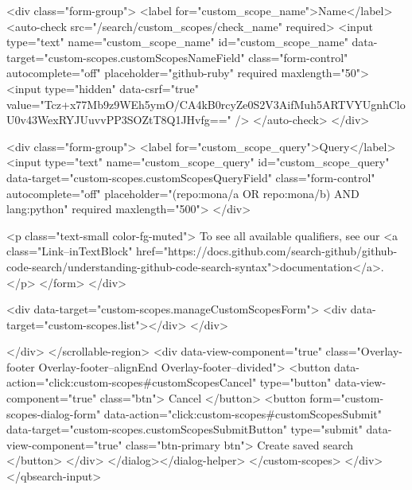           <div class="form-group">
            <label for="custom_scope_name">Name</label>
            <auto-check src="/search/custom_scopes/check_name" required>
              <input
                type="text"
                name="custom_scope_name"
                id="custom_scope_name"
                data-target="custom-scopes.customScopesNameField"
                class="form-control"
                autocomplete="off"
                placeholder="github-ruby"
                required
                maxlength="50">
              <input type="hidden" data-csrf="true" value="Tcz+x77Mb9z9WEh5ymO/CA4kB0rcyZe0S2V3AifMuh5ARTVYUgnhCloU0v43WexRYJUuvvPP3SOZtT8Q1JHvfg==" />
            </auto-check>
          </div>

          <div class="form-group">
            <label for="custom_scope_query">Query</label>
            <input
              type="text"
              name="custom_scope_query"
              id="custom_scope_query"
              data-target="custom-scopes.customScopesQueryField"
              class="form-control"
              autocomplete="off"
              placeholder="(repo:mona/a OR repo:mona/b) AND lang:python"
              required
              maxlength="500">
          </div>

          <p class="text-small color-fg-muted">
            To see all available qualifiers, see our <a class="Link--inTextBlock" href="https://docs.github.com/search-github/github-code-search/understanding-github-code-search-syntax">documentation</a>.
          </p>
</form>        </div>

        <div data-target="custom-scopes.manageCustomScopesForm">
          <div data-target="custom-scopes.list"></div>
        </div>

</div>
      </scrollable-region>
      <div data-view-component="true" class="Overlay-footer Overlay-footer--alignEnd Overlay-footer--divided">          <button data-action="click:custom-scopes#customScopesCancel" type="button" data-view-component="true" class="btn">    Cancel
</button>
          <button form="custom-scopes-dialog-form" data-action="click:custom-scopes#customScopesSubmit" data-target="custom-scopes.customScopesSubmitButton" type="submit" data-view-component="true" class="btn-primary btn">    Create saved search
</button>
</div>
</dialog></dialog-helper>
    </custom-scopes>
  </div>
</qbsearch-input>



